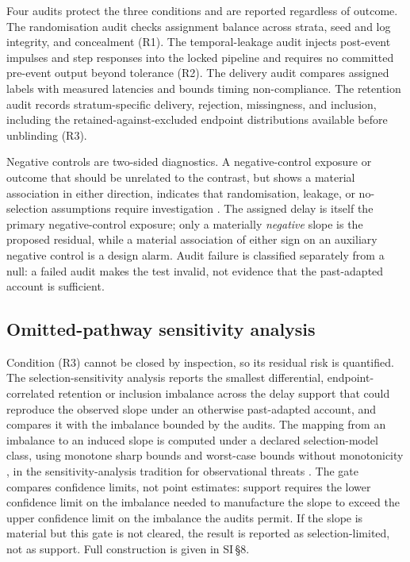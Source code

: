 \documentclass[11pt,a4paper]{article}
\theoremstyle{definition}
\begin{document}
Four audits protect the three conditions and are reported regardless of outcome.
The randomisation audit checks assignment balance across strata, seed and log
integrity, and concealment (R1). The temporal-leakage audit injects post-event
impulses and step responses into the locked pipeline and requires no committed
pre-event output beyond tolerance (R2). The delivery audit compares assigned
labels with measured latencies and bounds timing non-compliance. The retention
audit records stratum-specific delivery, rejection, missingness, and inclusion,
including the retained-against-excluded endpoint distributions available before
unblinding (R3).

Negative controls are two-sided diagnostics. A negative-control exposure or
outcome that should be unrelated to the contrast, but shows a material
association in either direction, indicates that randomisation, leakage, or
no-selection assumptions require investigation \citep{Lipsitch2010,Shi2020}. The
assigned delay is itself the primary negative-control exposure; only a materially
\textit{negative} slope is the proposed residual, while a material association of
either sign on an auxiliary negative control is a design alarm. Audit failure is
classified separately from a null: a failed audit makes the test
invalid, not evidence that the past-adapted account is sufficient.

\subsection{Omitted-pathway sensitivity analysis}
\label{sec:sensitivity}

Condition (R3) cannot be closed by inspection, so its residual risk is
quantified. The selection-sensitivity analysis reports the smallest differential,
endpoint-correlated retention or inclusion imbalance across the delay support
that could reproduce the observed slope under an otherwise past-adapted account,
and compares it with the imbalance bounded by the audits. The mapping from an
imbalance to an induced slope is computed under a declared selection-model class,
using monotone sharp bounds \citep{Lee2009} and worst-case bounds without
monotonicity \citep{Manski1990}, in the sensitivity-analysis tradition for
observational threats \citep{Rosenbaum2002}. The gate compares confidence limits,
not point estimates: support requires the lower confidence limit on the imbalance
needed to manufacture the slope to exceed the upper confidence limit on the
imbalance the audits permit. If the slope is material but this gate is not
cleared, the result is reported as selection-limited, not as support. Full
construction is given in SI\,\S8.
\end{document}
